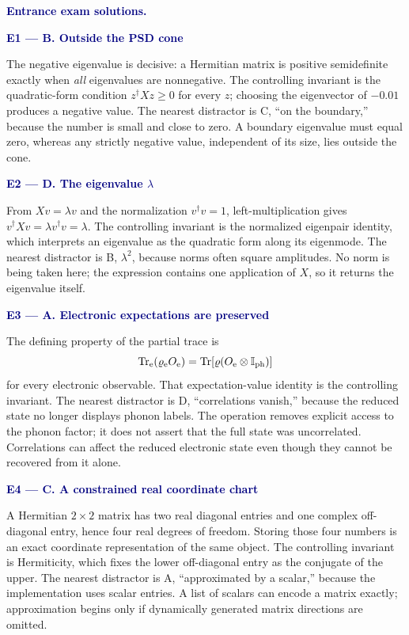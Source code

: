 \documentclass[10pt]{article}
\newcommand{\Tr}{\operatorname{Tr}}
\newcommand{\I}{\mathbb I}
\newcommand{\flowlead}[1]{%
  \par\medskip
  \needspace{3\baselineskip}%
  \noindent\textcolor{navy}{\textbf{#1.}}\enspace\ignorespaces
}
\newcommand{\qhead}[2]{%
  \needspace{8\baselineskip}
  \par\medskip\noindent\textcolor{navy}{\textbf{#1. #2}}\par
}
\begin{document}
\flowlead{Entrance exam solutions}

\qhead{E1 --- B}{Outside the PSD cone}

The negative eigenvalue is decisive: a Hermitian matrix is positive
semidefinite exactly when \emph{all} eigenvalues are nonnegative.  The
controlling invariant is the quadratic-form condition
\(z^\dagger Xz\geq0\) for every \(z\); choosing the eigenvector of
\(-0.01\) produces a negative value.  The nearest distractor is C, ``on the
boundary,'' because the number is small and close to zero.  A boundary
eigenvalue must equal zero, whereas any strictly negative value, independent
of its size, lies outside the cone.

\qhead{E2 --- D}{The eigenvalue \(\lambda\)}

From \(Xv=\lambda v\) and the normalization \(v^\dagger v=1\),
left-multiplication gives
\(v^\dagger Xv=\lambda v^\dagger v=\lambda\).  The controlling invariant is
the normalized eigenpair identity, which interprets an eigenvalue as the
quadratic form along its eigenmode.  The nearest distractor is B,
\(\lambda^2\), because norms often square amplitudes.  No norm is being taken
here; the expression contains one application of \(X\), so it returns the
eigenvalue itself.

\qhead{E3 --- A}{Electronic expectations are preserved}

The defining property of the partial trace is
\[
\Tr_{\rm e}(\varrho_{\rm e}O_{\rm e})
=\Tr[\varrho(O_{\rm e}\otimes\I_{\rm ph})]
\]
for every electronic observable.
That expectation-value identity is the controlling invariant.  The nearest
distractor is D, ``correlations vanish,'' because the reduced state no longer
displays phonon labels.  The operation removes explicit access to the phonon
factor; it does not assert that the full state was uncorrelated.  Correlations
can affect the reduced electronic state even though they cannot be recovered
from it alone.

\qhead{E4 --- C}{A constrained real coordinate chart}

A Hermitian \(2\times2\) matrix has two real diagonal entries and one complex
off-diagonal entry, hence four real degrees of freedom.  Storing those four
numbers is an exact coordinate representation of the same object.  The
controlling invariant is Hermiticity, which fixes the lower off-diagonal entry
as the conjugate of the upper.  The nearest distractor is A, ``approximated by
a scalar,'' because the implementation uses scalar entries.  A list of
scalars can encode a matrix exactly; approximation begins only if dynamically
generated matrix directions are omitted.
\end{document}
